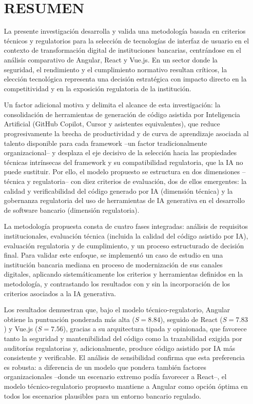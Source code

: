 \chapter*{RESUMEN}

La presente investigación desarrolla y valida una metodología basada en
criterios técnicos y regulatorios para la selección de tecnologías de
interfaz de usuario en el contexto de transformación digital de instituciones
bancarias, centrándose en el análisis comparativo de Angular, React y Vue.js.
En un sector donde la seguridad, el rendimiento y el cumplimiento normativo
resultan críticos, la elección tecnológica representa una decisión
estratégica con impacto directo en la competitividad y en la exposición
regulatoria de la institución.

Un factor adicional motiva y delimita el alcance de esta investigación: la
consolidación de herramientas de generación de código asistida por
Inteligencia Artificial (GitHub Copilot, Cursor y asistentes equivalentes), que
reduce progresivamente la brecha de productividad y de curva de aprendizaje
asociada al talento disponible para cada framework --un factor
tradicionalmente organizacional-- y desplaza el eje decisivo de la selección
hacia las propiedades técnicas intrínsecas del framework y su compatibilidad
regulatoria, que la IA no puede sustituir. Por ello, el modelo propuesto se
estructura en dos dimensiones --técnica y regulatoria-- con diez criterios de
evaluación, dos de ellos emergentes: la calidad y verificabilidad del código
generado por IA (dimensión técnica) y la gobernanza regulatoria del uso de
herramientas de IA generativa en el desarrollo de software bancario
(dimensión regulatoria).

La metodología propuesta consta de cuatro fases integradas: análisis de
requisitos institucionales, evaluación técnica (incluida la calidad del código
asistido por IA), evaluación regulatoria y de cumplimiento, y un proceso
estructurado de decisión final. Para validar este enfoque, se implementó un
caso de estudio en una institución bancaria mediana en proceso de
modernización de sus canales digitales, aplicando sistemáticamente los
criterios y herramientas definidos en la metodología, y contrastando los
resultados con y sin la incorporación de los criterios asociados a la IA
generativa.

Los resultados demuestran que, bajo el modelo técnico-regulatorio, Angular
obtiene la puntuación ponderada más alta ($S=8.84$), seguido de React
($S=7.83$) y Vue.js ($S=7.56$), gracias a su arquitectura tipada y opinionada,
que favorece tanto la seguridad y mantenibilidad del código como la
trazabilidad exigida por auditorías regulatorias y, adicionalmente, produce
código asistido por IA más consistente y verificable. El análisis de
sensibilidad confirma que esta preferencia es robusta: a diferencia de un
modelo que pondera también factores organizacionales --donde un escenario
extremo podía favorecer a React--, el modelo técnico-regulatorio propuesto
mantiene a Angular como opción óptima en todos los escenarios plausibles
para un entorno bancario regulado.

